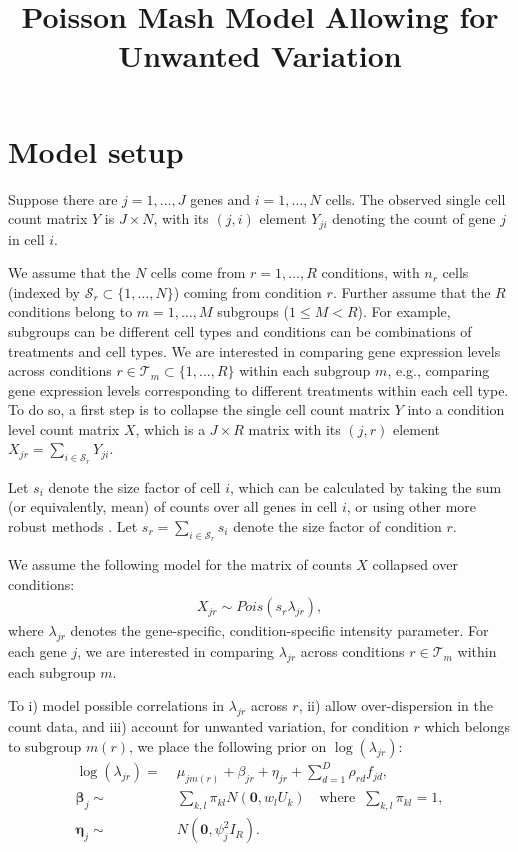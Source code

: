 \documentclass[onefignum,onetabnum,oneeqnum,final]{siamart190516}
\title{Poisson Mash Model Allowing for Unwanted Variation}
\date{}
\begin{document}
\maketitle




\section{Model setup} \label{model}
Suppose there are $j=1, \dots, J$ genes and $i=1, \dots, N$ cells. The observed single cell count matrix $Y$ is $J \times N$, with its $(j, i)$ element $Y_{ji}$ denoting the count of gene $j$ in cell $i$.  

We assume that the $N$ cells come from $r=1, \dots, R$ conditions, with $n_r$ cells (indexed by $\mathcal{S}_r \subset \{1, \dots, N\}$) coming from condition $r$. Further assume that the $R$ conditions belong to $m=1, \dots, M$ subgroups ($1 \leq M < R$). For example, subgroups can be different cell types and conditions can be combinations of treatments and cell types. We are interested in comparing gene expression levels across conditions $r \in \mathcal{T}_m \subset \{1, \dots, R\}$ within each subgroup $m$, e.g., comparing gene expression levels corresponding to different treatments within each cell type. To do so, a first step is to collapse the single cell count matrix $Y$ into a condition level count matrix $X$, which is a $J \times R$ matrix with its $(j, r)$ element $X_{jr} = \sum_{i \in \mathcal{S}_r} Y_{ji}$.  

Let $s_i$ denote the size factor of cell $i$, which can be calculated by taking the sum (or equivalently, mean) of counts over all genes in cell $i$, or using other more robust methods \cite{bullard2010evaluation, lun2016pooling}.  Let $s_r = \sum_{i \in \mathcal{S}_r} s_i$ denote the size factor of condition $r$. 

We assume the following model for the matrix of counts $X$ collapsed over conditions: 
\begin{align}
X_{jr} \sim Pois (s_r \lambda_{jr}),  \label{eq:1} 
\end{align}
where $\lambda_{jr}$ denotes the gene-specific, condition-specific intensity parameter. For each gene $j$, we are interested in comparing $\lambda_{jr}$ across conditions $r \in \mathcal{T}_m$ within each subgroup $m$.   

To i) model possible correlations in $\lambda_{jr}$ across $r$, ii) allow over-dispersion in the count data, and iii) account for unwanted variation, for  condition $r$ which belongs to subgroup $m(r)$, we place the following prior on $\log(\lambda_{jr})$: 
\begin{align}
\log \left(\lambda_{jr} \right) = & \; \mu_{jm(r)} + \beta_{jr}  + \eta_{jr} + \sum_{d=1}^D \rho_{rd} f_{jd}, \label{eq:2} \\
\bm{\beta}_j \sim & \; \sum_{k,l} \pi_{kl} N(\bm{0}, w_l U_k)  \quad \text{where} \;\; \sum_{k,l} \pi_{kl} =1, \label{eq:3} \\  
\bm{\eta}_j \sim & \; N(\bm{0}, \psi_j^2 I_R). \label{eq:4}
\end{align}
\end{document}
